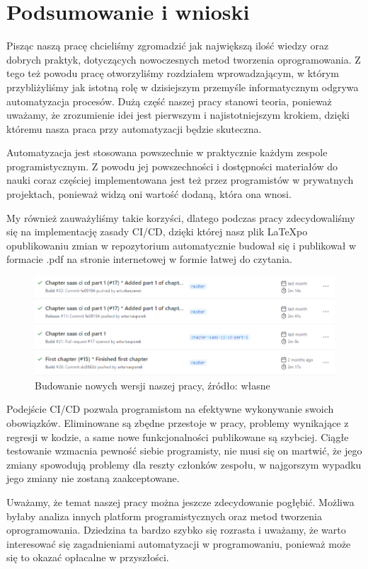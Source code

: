 \section{Podsumowanie i wnioski}
Pisząc naszą pracę chcieliśmy zgromadzić jak największą ilość wiedzy oraz dobrych praktyk, dotyczących nowoczesnych metod tworzenia oprogramowania. Z tego też powodu pracę otworzyliśmy rozdziałem wprowadzającym, w którym przybliżyliśmy jak istotną rolę w dzisiejszym przemyśle informatycznym odgrywa automatyzacja procesów. Dużą część naszej pracy stanowi teoria, ponieważ uważamy, że zrozumienie idei jest pierwszym i najistotniejszym krokiem, dzięki któremu nasza praca przy automatyzacji będzie skuteczna.

Automatyzacja jest stosowana powszechnie w praktycznie każdym zespole programistycznym. Z powodu jej powszechności i dostępności materiałów do nauki coraz częściej implementowana jest też przez programistów w prywatnych projektach, ponieważ widzą oni wartość dodaną, która ona wnosi. 

My również zauważyliśmy takie korzyści, dlatego podczas pracy zdecydowaliśmy się na implementację zasady CI/CD, dzięki której nasz plik \LaTeX po opublikowaniu zmian w repozytorium automatycznie budował się i publikował w formacie .pdf na stronie internetowej w formie łatwej do czytania. 

\begin{figure}[htbp]
    \centering
    \includegraphics[width=12cm]{images/podsumowanie.png}
    \caption{Budowanie nowych wersji naszej pracy, źródło: własne}
    \label{fig:podsumowanie}
\end{figure}

Podejście CI/CD pozwala programistom na efektywne wykonywanie swoich obowiązków. Eliminowane są zbędne przestoje w pracy, problemy wynikające z regresji w kodzie, a same nowe funkcjonalności publikowane są szybciej. Ciągłe testowanie wzmacnia pewność siebie programisty, nie musi się on martwić, że jego zmiany spowodują problemy dla reszty członków zespołu, w najgorszym wypadku jego zmiany nie zostaną zaakceptowane. 

Uważamy, że temat naszej pracy można jeszcze zdecydowanie pogłębić. Możliwa byłaby analiza innych platform programistycznych oraz metod tworzenia oprogramowania.  Dziedzina ta bardzo szybko się rozrasta i uważamy, że warto interesować się zagadnieniami automatyzacji w programowaniu, ponieważ może się to okazać opłacalne w przyszłości.  